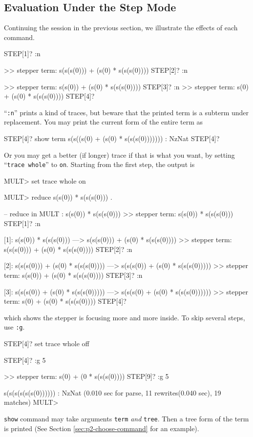 \documentclass[a4paper]{memoir}
\begin{document}
\subsection{Evaluation Under the Step Mode}\label{sec:p2-eval-step-mode}

Continuing the session in the previous section, we illustrate the
effects of each command.
\begin{vvtm}
\begin{ccode}
  STEP[1]? :n

  >> stepper term: s(s(s(0))) + (s(0) * s(s(s(0))))
  STEP[2]? :n

  >> stepper term: s(s(0)) + (s(0) * s(s(s(0))))
  STEP[3]? :n
  >> stepper term: s(0) + (s(0) * s(s(s(0))))
  STEP[4]? 
\end{ccode}
\end{vvtm}
``\verb|:n|'' prints a kind of traces, but beware that the printed term
is a subterm under replacement. You may print the current form of
the entire term as
\begin{vvtm}
\begin{ccode}
  STEP[4]? show term
  s(s((s(0) + (s(0) * s(s(s(0))))))) : NzNat
  STEP[4]? 
\end{ccode}
\end{vvtm}
Or you may get a better (if longer) trace if
that is what you want, by setting ``\verb|trace whole|'' to \verb|on|.
Starting from the first step, the output is
\begin{vvtm}
\begin{ccode}
  MULT> set trace whole on

  MULT> reduce s(s(0)) * s(s(s(0))) .

  -- reduce in MULT : s(s(0)) * s(s(s(0)))
  >> stepper term: s(s(0)) * s(s(s(0)))
  STEP[1]? :n

  [1]: s(s(0)) * s(s(s(0)))
   ---> s(s(s(0))) + (s(0) * s(s(s(0))))
  >> stepper term: s(s(s(0))) + (s(0) * s(s(s(0))))
  STEP[2]? :n

  [2]: s(s(s(0))) + (s(0) * s(s(s(0))))
   ---> s(s(s(0)) + (s(0) * s(s(s(0)))))
  >> stepper term: s(s(0)) + (s(0) * s(s(s(0))))
  STEP[3]? :n

  [3]: s(s(s(0)) + (s(0) * s(s(s(0)))))
   ---> s(s(s(0) + (s(0) * s(s(s(0))))))
  >> stepper term: s(0) + (s(0) * s(s(s(0))))
  STEP[4]? 
\end{ccode}
\end{vvtm}
which shows the stepper is focusing more and more inside. To skip
several steps, use \verb|:g|.
\begin{vvtm}
\begin{ccode}
  STEP[4]? set trace whole off

  STEP[4]? :g 5

  >> stepper term: s(0) + (0 * s(s(s(0))))
  STEP[9]? :g 5

  s(s(s(s(s(s(0)))))) : NzNat
  (0.010 sec for parse, 11 rewrites(0.040 sec), 19 matches)
  MULT> 
\end{ccode}
\end{vvtm}
\verb|show| command may take arguments \verb|term| {\em and} \verb|tree|.
Then a tree form of the term is printed
(See Section \ref{sec:p2-choose-command} for an example).
\end{document}

